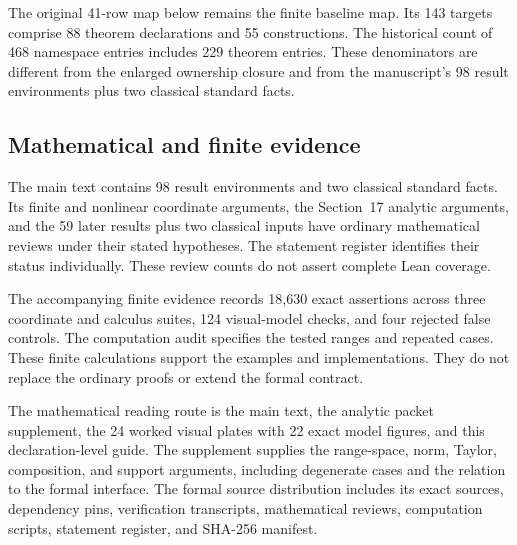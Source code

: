 The original 41-row map below remains the finite baseline map. Its 143 targets comprise 88 theorem declarations and 55 constructions. The historical count of 468 namespace entries includes 229 theorem entries. These denominators are different from the enlarged ownership closure and from the manuscript's 98 result environments plus two classical standard facts.


\subsection*{Mathematical and finite evidence}
The main text contains 98 result environments and two classical standard facts. Its finite and nonlinear coordinate arguments, the Section~17 analytic arguments, and the 59 later results plus two classical inputs have ordinary mathematical reviews under their stated hypotheses. The statement register identifies their status individually. These review counts do not assert complete Lean coverage.

The accompanying finite evidence records 18,630 exact assertions across three coordinate and calculus suites, 124 visual-model checks, and four rejected false controls. The computation audit specifies the tested ranges and repeated cases. These finite calculations support the examples and implementations. They do not replace the ordinary proofs or extend the formal contract.

The mathematical reading route is the main text, the analytic packet supplement, the 24 worked visual plates with 22 exact model figures, and this declaration-level guide. The supplement supplies the range-space, norm, Taylor, composition, and support arguments, including degenerate cases and the relation to the formal interface. The formal source distribution includes its exact sources, dependency pins, verification transcripts, mathematical reviews, computation scripts, statement register, and SHA-256 manifest.

